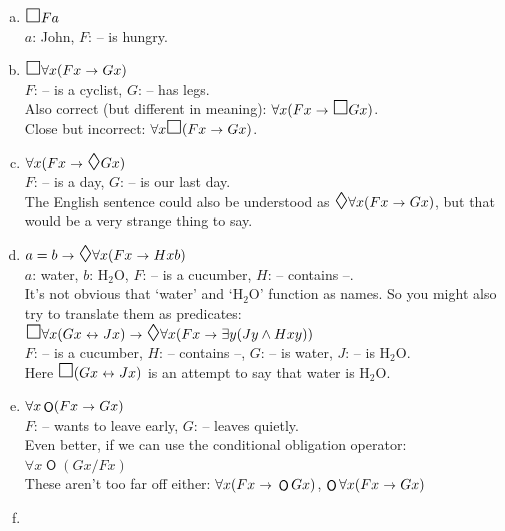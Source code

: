 \documentclass{scrartcl}
\let\oldbox\Box
\renewcommand\Box{\scaleobj{1.2}{\oldbox}}
\let\olddiamond\Diamond
\renewcommand\Diamond{\scaleobj{1.2}{\olddiamond}}
\let\oldto\to
\renewcommand\to{\scaleobj{0.95}{\,\oldto\,}}
\let\oldleftrightarrow\leftrightarrow
\renewcommand\leftrightarrow{\scaleobj{0.95}{\,\oldleftrightarrow\,}}
\DeclareMathOperator{\Ob}{\mathsf{O}}
\begin{document}
  \begin{enumerate}[(a)]
  \item $\Box Fa$ \\ $a$: John, $F$: -- is hungry.\\[-2mm]
  \item $\Box \forall x(Fx \to Gx)$ \\ $F$: -- is a cyclist, $G$: -- has legs.\\[1mm]
    Also correct (but different in meaning): $\forall x (Fx \to \Box Gx)$.\\
    Close but incorrect: $\forall x \Box(Fx \to Gx)$.\\[-2mm]
  \item $\forall x (Fx \to \Diamond Gx)$ \\ $F$: -- is a day, $G$: -- is our last day.\\[1mm]
    The English sentence could also be understood as
    $\Diamond \forall x (Fx \to Gx)$, but that would be a very strange
    thing to say.\\[-2mm]
  \item $a=b \to \Diamond \forall x(Fx \to Hxb)$ \\ $a$: water, $b$: H$_2$O, $F$: -- is a cucumber, $H$: -- contains --.\\[1mm]
    It's not obvious that `water' and `H$_2$O' function as names. So you might also try to translate them as predicates:\\[1mm]
    $\Box\forall x (Gx \leftrightarrow Jx) \to \Diamond \forall x (Fx \to
    \exists y(Jy \land Hxy))$\\
    $F$: -- is a cucumber, $H$: -- contains --, $G$: -- is water, $J$: -- is H$_2$O.\\[1mm]
    Here $\Box(Gx \leftrightarrow Jx)$ is an attempt to say that water is H$_2$O.
    \\[-2mm]


  \item %
    $\forall x \Ob(Fx \to Gx)$\\
    $F$: -- wants to leave early, $G$: -- leaves quietly.\\[1mm]
    Even better, if we can use the conditional obligation operator: $\forall x \Ob(Gx / Fx)$\\[1mm]
    These aren't too far off either:
    $\forall x (Fx \to \Ob Gx)$, $\Ob\forall x(Fx \to Gx)$
    \\[-2mm]

  \item %


\end{enumerate}
\end{document}
